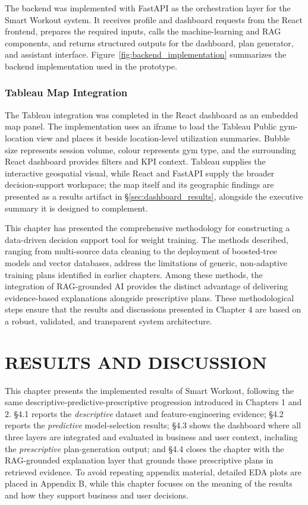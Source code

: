 \documentclass{aitthesis}
\begin{document}
The backend was implemented with FastAPI as the orchestration layer for the Smart Workout system. It receives profile and dashboard requests from the React frontend, prepares the required inputs, calls the machine-learning and RAG components, and returns structured outputs for the dashboard, plan generator, and assistant interface. Figure~\ref{fig:backend_implementation} summarizes the backend implementation used in the prototype.

\subsection{Tableau Map Integration}

The Tableau integration was completed in the React dashboard as an embedded map panel. The implementation uses an iframe to load the Tableau Public gym-location view and places it beside location-level utilization summaries. Bubble size represents session volume, colour represents gym type, and the surrounding React dashboard provides filters and KPI context. Tableau supplies the interactive geospatial visual, while React and FastAPI supply the broader decision-support workspace; the map itself and its geographic findings are presented as a results artifact in \S\ref{sec:dashboard_results}, alongside the executive summary it is designed to complement.

This chapter has presented the comprehensive methodology for constructing a data-driven decision support tool for weight training. The methods described, ranging from multi-source data cleaning to the deployment of boosted-tree models and vector databases, address the limitations of generic, non-adaptive training plans identified in earlier chapters. Among these methods, the integration of RAG-grounded AI provides the distinct advantage of delivering evidence-based explanations alongside prescriptive plans. These methodological steps ensure that the results and discussions presented in Chapter 4 are based on a robust, validated, and transparent system architecture.

\chapter{RESULTS AND DISCUSSION}

This chapter presents the implemented results of Smart Workout, following the same descriptive-predictive-prescriptive progression introduced in Chapters 1 and 2. \S4.1 reports the \emph{descriptive} dataset and feature-engineering evidence; \S4.2 reports the \emph{predictive} model-selection results; \S4.3 shows the dashboard where all three layers are integrated and evaluated in business and user context, including the \emph{prescriptive} plan-generation output; and \S4.4 closes the chapter with the RAG-grounded explanation layer that grounds those prescriptive plans in retrieved evidence. To avoid repeating appendix material, detailed EDA plots are placed in Appendix B, while this chapter focuses on the meaning of the results and how they support business and user decisions.
\end{document}

